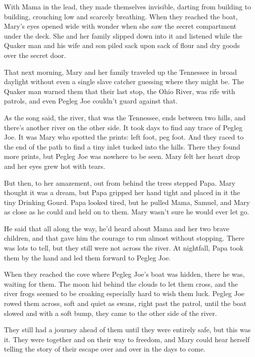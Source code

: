 With Mama in the lead, they made themselves invisible, darting from building to building, crouching low and scarcely breathing. When they reached the boat, Mary's eyes opened wide with wonder when she saw the secret compartment under the deck. She and her family slipped down into it and listened while the Quaker man and his wife and son piled sack upon sack of flour and dry goods over the secret door.

That next morning, Mary and her family traveled up the Tennessee in broad daylight without even a single slave catcher guessing where they might be. The Quaker man warned them that their last stop, the Ohio River, was rife with patrols, and even Pegleg Joe couldn't guard against that.

As the song said, the river, that was the Tennessee, ends between two hills, and there's another river on the other side. It took days to find any trace of Pegleg Joe. It was Mary who spotted the prints: left foot, peg foot. And they raced to the end of the path to find a tiny inlet tucked into the hills. There they found more prints, but Pegleg Joe was nowhere to be seen. Mary felt her heart drop and her eyes grew hot with tears.

But then, to her amazement, out from behind the trees stepped Papa. Mary thought it was a dream, but Papa gripped her hand tight and placed in it the tiny Drinking Gourd. Papa looked tired, but he pulled Mama, Samuel, and Mary as close as he could and held on to them. Mary wasn't sure he would ever let go.

He said that all along the way, he'd heard about Mama and her two brave children, and that gave him the courage to run almost without stopping. There was lots to tell, but they still were not across the river. At nightfall, Papa took them by the hand and led them forward to Pegleg Joe.

When they reached the cove where Pegleg Joe's boat was hidden, there he was, waiting for them. The moon hid behind the clouds to let them cross, and the river frogs seemed to be croaking especially hard to wish them luck. Pegleg Joe rowed them across, soft and quiet as swans, right past the patrol, until the boat slowed and with a soft bump, they came to the other side of the river.

They still had a journey ahead of them until they were entirely safe, but this was it. They were together and on their way to freedom, and Mary could hear herself telling the story of their escape over and over in the days to come.

